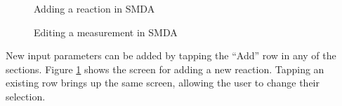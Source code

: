 \begin{figure}[htb]
    \caption{\label{fig:smda_add_reaction} Adding a reaction in SMDA}
\end{figure}

\begin{figure}[htb]
    \caption{\label{fig:smda_edit_measurement} Editing a measurement in SMDA}
\end{figure}

New input parameters can be added by tapping the ``Add'' row in any of the
sections. Figure \ref{fig:smda_add_reaction} shows the screen for adding a new
reaction. Tapping an existing row brings up the same screen, allowing the user
to change their selection.

